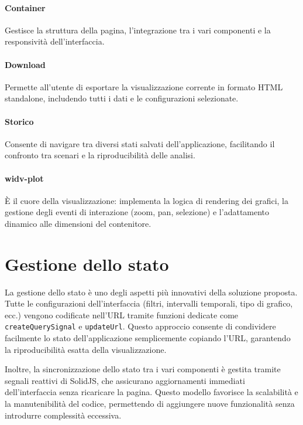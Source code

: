 \paragraph{Container} Gestisce la struttura della pagina, l'integrazione tra i vari componenti e la responsività dell'interfaccia.

\paragraph{Download} Permette all'utente di esportare la visualizzazione corrente in formato HTML standalone, includendo tutti i dati e le configurazioni selezionate.

\paragraph{Storico} Consente di navigare tra diversi stati salvati dell'applicazione, facilitando il confronto tra scenari e la riproducibilità delle analisi.

\paragraph{widv-plot} È il cuore della visualizzazione: implementa la logica di rendering dei grafici, la gestione degli eventi di interazione (zoom, pan, selezione) e l'adattamento dinamico alle dimensioni del contenitore.

\section{Gestione dello stato}

La gestione dello stato è uno degli aspetti più innovativi della soluzione proposta. Tutte le configurazioni dell'interfaccia (filtri, intervalli temporali, tipo di grafico, ecc.) vengono codificate nell'URL tramite funzioni dedicate come \texttt{createQuerySignal} e \texttt{updateUrl}. Questo approccio consente di condividere facilmente lo stato dell'applicazione semplicemente copiando l'URL, garantendo la riproducibilità esatta della visualizzazione.

Inoltre, la sincronizzazione dello stato tra i vari componenti è gestita tramite segnali reattivi di SolidJS, che assicurano aggiornamenti immediati dell'interfaccia senza ricaricare la pagina. Questo modello favorisce la scalabilità e la manutenibilità del codice, permettendo di aggiungere nuove funzionalità senza introdurre complessità eccessiva.

